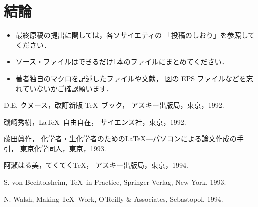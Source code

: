 \documentclass[paper]{ieicej}
\newcommand{\AmSLaTeX}{%
 $\mathcal A$\lower.4ex\hbox{$\!\mathcal M\!$}$\mathcal S$-\LaTeX}
\begin{document}
\section{結論}
\label{sec:conclusion}

\begin{itemize}
\item
最終原稿の提出に関しては，各ソサイエティの
「投稿のしおり」を参照してください．
\item
ソース・ファイルはできるだけ1本のファイルにまとめてください．
\item
著者独自のマクロを記述したファイルや文献，
図の EPS ファイルなどを忘れていないかご確認願います．
\end{itemize}

\begin{thebibliography}{99}





D.E. クヌース，改訂新版 \TeX\ ブック，
アスキー出版局，東京，1992.

磯崎秀樹，\LaTeX\ 自由自在，
サイエンス社，東京，1992.



藤田眞作，
化学者・生化学者のための\LaTeX---パソコンによる論文作成の手引，
東京化学同人，東京，1993.


阿瀬はる美，てくてく\TeX{}，
アスキー出版局，東京，1994.

S. von Bechtolsheim, \TeX\ in Practice,
Springer-Verlag, New York, 1993.

N. Walsh, Making \TeX\ Work,
O'Reilly \& Associates, Sebastopol, 1994.


\end{thebibliography}
\end{document}
